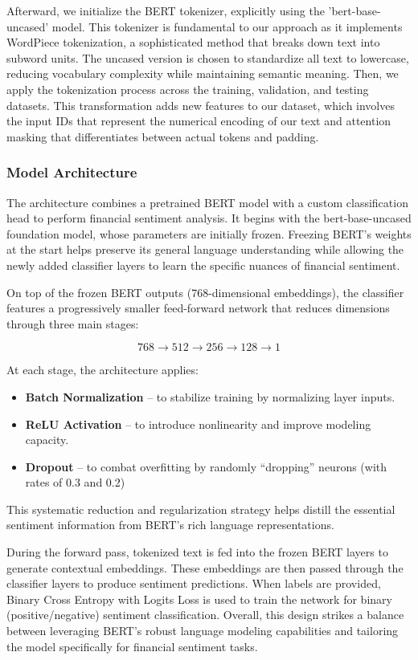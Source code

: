 \documentclass[12pt]{article}
\begin{document}
Afterward, we initialize the BERT tokenizer, explicitly using the 'bert-base-uncased' model. This tokenizer is fundamental to our approach as it implements WordPiece tokenization, a sophisticated method that breaks down text into subword units. The uncased version is chosen to standardize all text to lowercase, reducing vocabulary complexity while maintaining semantic meaning. Then, we apply the tokenization process across the training, validation, and testing datasets. This transformation adds new features to our dataset, which involves the input IDs that represent the numerical encoding of our text and attention masking that differentiates between actual tokens and padding.


\subsubsection*{Model Architecture}

The architecture combines a pretrained BERT model with a custom classification head to perform financial sentiment analysis. It begins with the bert-base-uncased foundation model, whose parameters are initially frozen. Freezing BERT’s weights at the start helps preserve its general language understanding while allowing the newly added classifier layers to learn the specific nuances of financial sentiment.

On top of the frozen BERT outputs (768-dimensional embeddings), the classifier features a progressively smaller feed-forward network that reduces dimensions through three main stages:

\[
	768\rightarrow 512\rightarrow 256\rightarrow 128\rightarrow 1
\]

At each stage, the architecture applies:

\begin{itemize}
	\item \textbf{Batch Normalization} – to stabilize training by normalizing layer inputs.
	\item \textbf{ReLU Activation} – to introduce nonlinearity and improve modeling capacity.
	\item \textbf{Dropout} – to combat overfitting by randomly “dropping” neurons (with rates of 0.3 and 0.2)
\end{itemize}

This systematic reduction and regularization strategy helps distill the essential sentiment information from BERT’s rich language representations.

During the forward pass, tokenized text is fed into the frozen BERT layers to generate contextual embeddings. These embeddings are then passed through the classifier layers to produce sentiment predictions. When labels are provided, Binary Cross Entropy with Logits Loss is used to train the network for binary (positive/negative) sentiment classification. Overall, this design strikes a balance between leveraging BERT’s robust language modeling capabilities and tailoring the model specifically for financial sentiment tasks.
\end{document}

